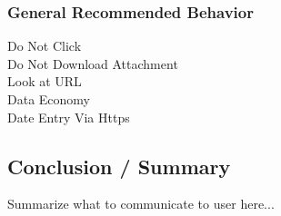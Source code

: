\subsubsection{General Recommended Behavior}
\begin{description}
	\item[Do Not Click]
	\item[Do Not Download Attachment]
	\item[Look at URL]
	\item[Data Economy]
	\item[Date Entry Via Https]
\end{description}

\subsection{Conclusion / Summary}

Summarize what to communicate to user here...

